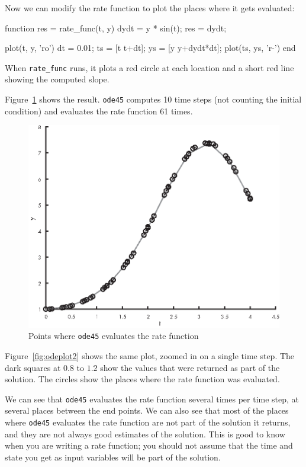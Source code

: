
Now we can modify the rate function to plot the places where it gets evaluated:

\begin{code}
function res = rate_func(t, y)
    dydt = y * sin(t);
    res = dydt;

    plot(t, y, 'ro')
    dt = 0.01;
    ts = [t t+dt];
    ys = [y y+dydt*dt];
    plot(ts, ys, 'r-')
end
\end{code}

When \lstinline{rate_func} runs, it plots a red circle at each location and a short red line showing the computed slope.


Figure~\ref{fig:odeplot1} shows the result.  \lstinline{ode45} computes 10 time steps (not counting the initial condition) and evaluates the rate function 61 times.

\begin{figure}
\centerline{\includegraphics{book/images/figure15_01_new.eps}}
\caption{Points where \lstinline{ode45} evaluates the rate function}
\label{fig:odeplot1}
\end{figure}

Figure~\ref{fig:odeplot2} shows the same plot, zoomed in on a single time step.
The dark squares at $0.8$ to $1.2$ show the values that were returned as part of the solution.
The circles show the places where the rate function was evaluated.

We can see that \lstinline{ode45} evaluates the rate function several times per time step, at several places between the end points.
We can also see that most of the places where \lstinline{ode45} evaluates the rate function are not part of the solution it returns, and they are not always good estimates of the solution.
This is good to know when you are writing a rate function; you should not assume that the time and state you get as input variables will be part of the solution.

